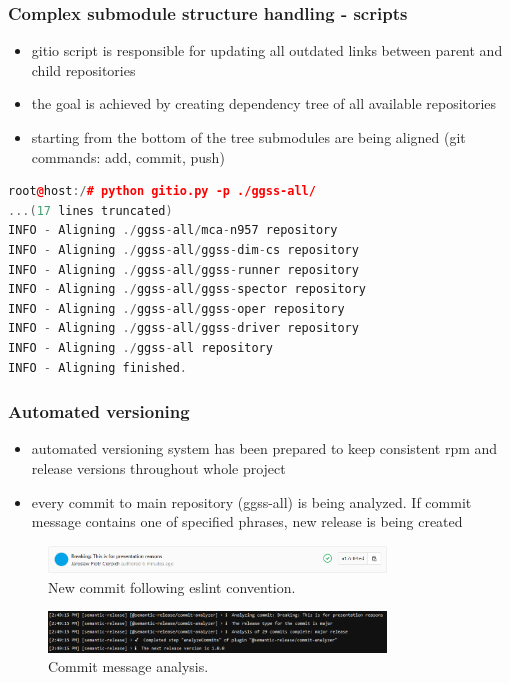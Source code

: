 \documentclass[10pt]{beamer}
\begin{document}
\begin{frame}[fragile]
\frametitle{Complex submodule structure handling - scripts}
\begin{itemize}
\item gitio script is responsible for updating all outdated links between parent and child repositories
\item the goal is achieved by creating dependency tree of all available repositories
\item starting from the bottom of the tree submodules are being aligned (git commands: add, commit, push)
\end{itemize}
\begin{lstlisting}[language=c++, caption={Gitio in action.}]
root@host:/# python gitio.py -p ./ggss-all/
...(17 lines truncated)
INFO - Aligning ./ggss-all/mca-n957 repository
INFO - Aligning ./ggss-all/ggss-dim-cs repository
INFO - Aligning ./ggss-all/ggss-runner repository
INFO - Aligning ./ggss-all/ggss-spector repository
INFO - Aligning ./ggss-all/ggss-oper repository
INFO - Aligning ./ggss-all/ggss-driver repository
INFO - Aligning ./ggss-all repository
INFO - Aligning finished.
\end{lstlisting}
\end{frame}


\begin{frame}[fragile]
\frametitle{Automated versioning}
\begin{itemize}
\item automated versioning system has been prepared to keep consistent rpm and release versions throughout whole project
\item every commit to main repository (ggss-all) is being analyzed. If commit message contains one of specified phrases, new release is being created
\end{itemize}
\begin{figure}
    \centering
    \includegraphics[width=0.8\textwidth]{resources/commit.PNG}
    \caption{New commit following eslint convention.}
\end{figure}
\begin{figure}
    \centering
    \includegraphics[width=0.8\textwidth]{resources/commit_message_analyze.PNG}
    \caption{Commit message analysis.}
\end{figure}

\end{frame}
\end{document}
